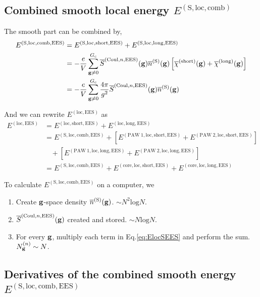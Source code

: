 \documentclass[paper=a4, fontsize=11pt]{article} %
\numberwithin{equation}{section} %
\numberwithin{figure}{section} %
\numberwithin{table}{section} %
\newcommand{\ol}{\overline}
\newcommand{\bg}{{\bf{g}}}
\newcommand{\rS}{{\mathrm{S}}}
\newcommand{\rEES}{{\mathrm{EES}}}
\newcommand{\rcore}{{\mathrm{core}}}
\newcommand{\rCo}{{\mathrm{Coul}}}
\newcommand{\rshort}{{\mathrm{short}}}
\newcommand{\rlong}{{\mathrm{long}}}
\newcommand{\rP}{{\mathrm{PAW}}}
\newcommand{\rcomb}{{\mathrm{comb}}}
\newcommand{\rlo}{{\mathrm{loc}}}
\newcommand{\rl}{{\mathrm{log}}}
\newcommand{\Ngn}{{N^{(n)}_\bg}}
\newcommand{\Gc}{{G_{\mathrm{c}}}}
\begin{document}
\subsection{Combined smooth local energy $E^{(\rS,\rlo,\rcomb)}$}
The smooth part can be combined by,
\begin{equation}\label{eq:ElocS}
\begin{split}
E^{(\rS,\rlo,\rcomb,\rEES)}
&= E^{(\rS,\rlo,\rshort,\rEES)} + E^{(\rS,\rlo,\rlong,\rEES)} \\
&= -\frac{e}{V}\sum_{\bg \neq 0}^\Gc \ol S^{(\rCo,n,\rEES)}(\bg)\overline{n}^{(\rS)}(\bg) \left[\ol \chi^{(\rshort)}(\bg)+\ol \chi^{(\rlong)}(\bg) \right] \\
&= -\frac{e}{V}\sum_{\bg \neq 0}^\Gc \frac{4\pi}{g^2} \ol S^{(\rCo,n,\rEES)}(\bg)\overline{n}^{(\rS)}(\bg)
\end{split}
\end{equation}

And we can rewrite $E^{(\rlo,\rEES)}$ as
\begin{equation}\label{eq:ElocSEES} 
\begin{split}
E^{(\rlo,\rEES)}
&= E^{(\rlo,\rshort,\rEES)} +E^{(\rlo,\rlong,\rEES)} \\
&= E^{(\rS,\rlo,\rcomb,\rEES)} + \left[E^{(\rP\ 1,\rlo,\rshort,\rEES)} + E^{(\rP\ 2,\rlo,\rshort,\rEES)}\right] \\
&\ \ \ \ +\left[E^{(\rP\ 1,\rlo,\rlong,\rEES)} + E^{(\rP\ 2,\rlo,\rlong,\rEES)} \right]\\
&= E^{(\rS,\rlo,\rcomb,\rEES)} + E^{(\rcore,\rlo,\rshort,\rEES)}  + E^{(\rcore,\rlo,\rlong,\rEES)}
\end{split}
\end{equation}


To calculate $E^{(\rS,\rlo,\rcomb,\rEES)}$ on a computer, we
\begin{enumerate}
\item Create $\bg$-space density $\ol{n}^{(\rS)}(\bg)$. $\sim N^2 \rl N$.
\item $\ol S^{(\rCo,n,\rEES)}(\bg)$ created and stored. $\sim N\rl N$.
\item For every $\bg$, multiply each term in Eq.\eqref{eq:ElocSEES} and perform the sum. $\Ngn \sim N$.
\end{enumerate}

\subsection{Derivatives of the combined smooth energy $E^{(\rS,\rlo,\rcomb,\rEES)}$}
\end{document}
